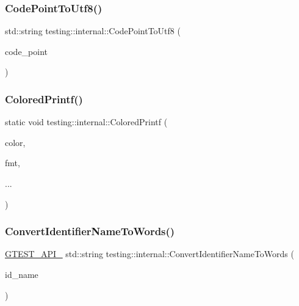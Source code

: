 \mbox{\label{namespacetesting_1_1internal_a0c0f9558efb9abb965851c4738cdc725}} 
\subsubsection{\texorpdfstring{CodePointToUtf8()}{CodePointToUtf8()}}
{\footnotesize\ttfamily std\+::string testing\+::internal\+::\+Code\+Point\+To\+Utf8 (\begin{DoxyParamCaption}\item[{\mbox{\hyperlink{namespacetesting_1_1internal_a40d4fffcd2bf56f18b1c380615aa85e3}{U\+Int32}}}]{code\+\_\+point }\end{DoxyParamCaption})}

\mbox{\label{namespacetesting_1_1internal_a1d9493ff218e622051c53094eb54bcd6}} 
\subsubsection{\texorpdfstring{ColoredPrintf()}{ColoredPrintf()}}
{\footnotesize\ttfamily static void testing\+::internal\+::\+Colored\+Printf (\begin{DoxyParamCaption}\item[{\mbox{\hyperlink{namespacetesting_1_1internal_a648c1bc94c2ef9e868ff3f9dff0f9c4e}{G\+Test\+Color}}}]{color,  }\item[{const char $\ast$}]{fmt,  }\item[{}]{... }\end{DoxyParamCaption})\hspace{0.3cm}{\ttfamily [static]}}

\mbox{\label{namespacetesting_1_1internal_a0b375abcf3081393e6c420194a541b29}} 
\subsubsection{\texorpdfstring{ConvertIdentifierNameToWords()}{ConvertIdentifierNameToWords()}}
{\footnotesize\ttfamily \mbox{\hyperlink{gtest-port_8h_aa73be6f0ba4a7456180a94904ce17790}{G\+T\+E\+S\+T\+\_\+\+A\+P\+I\+\_\+}} std\+::string testing\+::internal\+::\+Convert\+Identifier\+Name\+To\+Words (\begin{DoxyParamCaption}\item[{const char $\ast$}]{id\+\_\+name }\end{DoxyParamCaption})}

